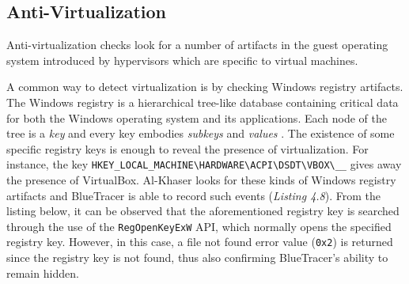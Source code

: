\subsection{Anti-Virtualization}
Anti-virtualization checks look for a number of artifacts in the guest operating system introduced by hypervisors which are specific to virtual machines.

A common way to detect virtualization is by checking Windows registry artifacts. The Windows registry is a hierarchical tree-like database containing critical data for both the Windows operating system and its applications. Each node of the tree is a \textit{key} and every key embodies \textit{subkeys} and \textit{values} \cite{Regs}. The existence of some specific registry keys is enough to reveal the presence of virtualization. For instance, the key \texttt{HKEY\_LOCAL\_MACHINE\textbackslash}\texttt{{HARDWARE}\textbackslash{ACPI}\textbackslash{DSDT}}\texttt{\textbackslash{VBOX}\textbackslash\_\_}
gives away the presence of VirtualBox. Al-Khaser looks for these kinds of Windows registry artifacts and BlueTracer is able to record such events (\textit{Listing 4.8}). From the listing below, it can be observed that the aforementioned registry key is searched through the use of the \texttt{RegOpenKeyExW} API, which normally opens the specified registry key. However, in this case, a file not found error value (\texttt{0x2}) is returned since the registry key is not found, thus also confirming BlueTracer's ability to remain hidden.


